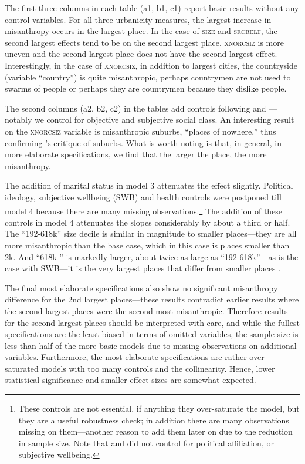 \documentclass[11pt, letterpaper]{article}
\begin{document}
\begin{spacing}{1.4}
The first three columns in each table (a1, b1, c1) report basic results without any control variables. For all three
urbanicity measures, the largest increase in misanthropy occurs in the largest
place. In the case of \textsc{size} and \textsc{srcbelt}, the second largest effects
tend to be on the second largest place. \textsc{xnorcsiz} is more uneven and the
second largest place does not have the second largest effect. Interestingly, in
the case of \textsc{xnorcsiz}, in addition to largest cities,  the countryside (variable ``country'') is quite
misanthropic, perhaps countrymen are not used to swarms of people or perhaps they are countrymen because they dislike people. 

The second columns (a2, b2, c2) in the tables add controls following \citet{welch07} and \citet{smith97}---notably we control for objective and subjective social class. An interesting result on the \textsc{xnorcsiz} variable is misanthropic suburbs, ``places of nowhere,'' thus confirming \citet{kunstler12}'s critique of suburbs.
What is worth noting is that, in general, in more elaborate specifications, we find that the larger the place, the more misanthropy. 

The addition of marital status in model 3 attenuates the effect slightly. Political ideology, subjective wellbeing (SWB) and health controls were postponed till model 4 because there are many missing observations.\footnote{These controls are not essential, if anything they over-saturate the model, but they are a useful robustness check; in addition there are many observations missing on them---another reason to add them later on due to the reduction in sample size. Note that \citet{smith97} and \citet{wilson85} did not control for political affiliation, or subjective wellbeing.} 
The addition of these controls in model 4 attenuates the slopes considerably by about a third or half. The ``192-618k'' size decile is similar in magnitude to smaller places---they are all  more misanthropic than the base case, which in this case is places smaller than 2k. And ``618k-'' is markedly larger, about twice as large as ``192-618k''---as is the case with SWB---it is the very largest places that differ from smaller places \citep{aokCityBook15}. 

The final most elaborate specifications also show no significant misanthropy difference for the 2nd largest places---these results contradict earlier results where the second largest places were the second most misanthropic. Therefore results for the second largest places should be interpreted with care, and while the fullest specifications are the least biased in terms of omitted variables, the sample size is less than half of the more basic models due to missing observations on additional variables. Furthermore, the most elaborate specifications are rather over-saturated models with too many controls and the collinearity. Hence, lower statistical significance and smaller effect sizes are somewhat expected. 


\end{spacing}
\end{document}
